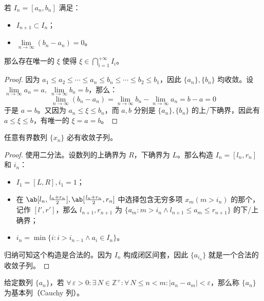 \begin{theorem}[闭区间套定理]
	若 $I_n = [a_n, b_n]$ 满足：

	\begin{itemize}
		\item $I_{n+1} \subset I_n$；
		\item $\lim\limits_{n \to \infty} (b_n - a_n) = 0$。
	\end{itemize}

	那么存在唯一的 $\xi$ 使得 $\xi \in \bigcap_{i=1}^{+\infty} I_i$。

	\begin{proof}
		因为 $a_1 \le a_2 \le \cdots \le a_n \le b_n \le \cdots \le b_2 \le b_1$，因此 $\{a_n\},\{b_n\}$ 均收敛。设 $\lim\limits_{n \to \infty} a_n = a,\ \lim\limits_{n \to \infty} b_n = b$，那么：
		$$
		\lim_{n \to \infty} (b_n - a_n) = \lim_{n \to \infty} b_n - \lim_{n \to \infty} a_n = b - a = 0
		$$
		于是 $a = b$。又因为 $a_n \le \xi \le b_n$，而 $a,b$ 分别是 $\{a_n\},\{b_n\}$ 的上/下确界，因此有 $a \le \xi \le b$，有唯一的 $\xi = a = b$。
	\end{proof}
\end{theorem}

\begin{theorem}[列紧性定理]
	任意有界数列 $\{x_n\}$ 必有收敛子列。

	\begin{proof}
		使用二分法。设数列的上确界为 $R$，下确界为 $L$。那么构造 $I_n = [l_n, r_n]$ 和 $i_n$：
		
		\begin{itemize}
			\item $I_1 = [L, R], i_1 = 1$；
			\item 在 $\ab[l_n, \frac{l_n + r_n}{2}], \ab[\frac{l_n + r_n}{2}, r_n]$ 中选择包含无穷多项 $x_m (m > i_n)$ 的那个，记作 $[l', r']$，那么 $l_{n+1}, r_{n+1}$ 为 $\{a_m: m > i_n \land l_{n+1} \le a_m \le r_{n+1}\}$ 的下/上确界；
			\item $i_n = \min\{i: i > i_{n-1} \land a_i \in I_n\}$。
		\end{itemize}

		归纳可知这个构造是合法的。因为 $I_n$ 构成闭区间套，因此 $\{a_{i_n}\}$ 就是一个合法的收敛子列。
	\end{proof}
\end{theorem}

\begin{definition}[柯西基本列]
	给定数列 $\{a_n\}$，若 $\forall\,\varepsilon > 0: \exists\,N \in \mathbb{Z}^+: \forall\, N \le n < m: |a_n - a_m| < \varepsilon$，那么称 $\{a_n\}$ 为基本列（Cauchy 列）。
\end{definition}

